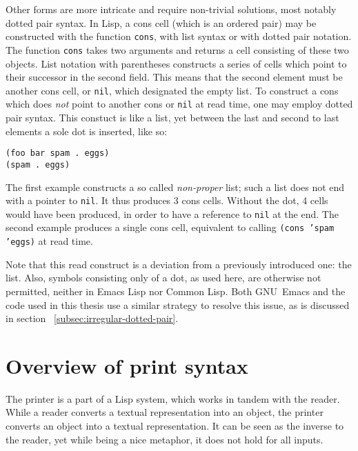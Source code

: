 \documentclass[a4paper,10pt,twoside]{report}
\newcommand{\el}{Emacs Lisp}
\newcommand{\cl}{Common Lisp}
\newcommand{\sym}[1]{\texttt{#1}}
\newcommand{\fun}[1]{\texttt{#1}}
\newcommand{\emacs}{GNU~Emacs}
\newcommand{\nil}{\sym{nil}}
\begin{document}
Other forms are more intricate and require non-trivial solutions, most notably
dotted pair syntax.  In Lisp, a cons cell (which is an ordered pair) may be
constructed with the function \fun{cons}, with list syntax or with dotted pair
notation.  The function \fun{cons} takes two arguments and returns a cell
consisting of these two objects.  List notation with parentheses constructs a
series of cells which point to their successor in the second field.  This means
that the second element must be another cons cell, or \nil{}, which designated the
empty list.  To construct a cons which does \emph{not} point to another cons or
\nil{} at read time, one may employ dotted pair syntax.  This constuct is like a
list, yet between the last and second to last elements a sole dot is inserted,
like so:

\begin{lstlisting}[style=lispinline]
(foo bar spam . eggs)
(spam . eggs)
\end{lstlisting}

The first example constructs a so called \emph{non-proper} list; such a list
does not end with a pointer to \nil{}.  It thus produces 3 cons cells.  Without
the dot, 4 cells would have been produced, in order to have a reference to
\nil{} at the end.  The second example produces a single cons cell, equivalent
to calling \texttt{(cons 'spam 'eggs)} at read time.

Note that this read construct is a deviation from a previously introduced one:
the list.  Also, symbols consisting only of a dot, as used here, are otherwise
not permitted, neither in \el{} nor \cl{}.  Both \emacs{} and the code used in
this thesis use a similar strategy to resolve this issue, as is discussed in
section ~\ref{subsec:irregular-dotted-pair}.


\section{Overview of print syntax}
\label{subsec:print-syntax}

The printer is a part of a Lisp system, which works in tandem with the reader.
While a reader converts a textual representation into an object, the printer
converts an object into a textual representation.  It can be seen as the inverse
to the reader, yet while being a nice metaphor, it does not hold for all inputs.
\end{document}
